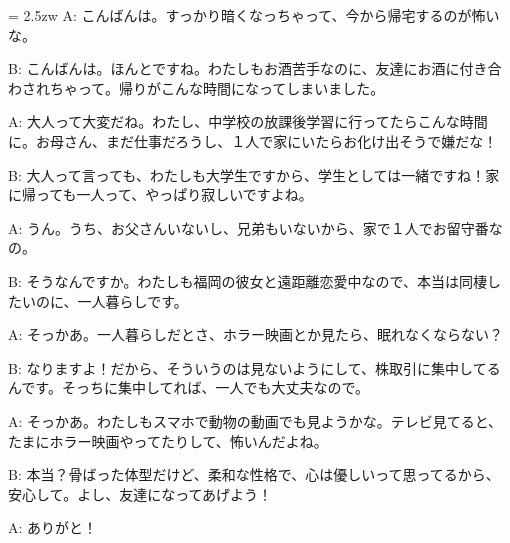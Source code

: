 \documentclass[11pt]{amsart}
\title{}
\author{}
\newenvironment{hangall}[1]{\hangindent = 2.5zw\everypar{\hangindent = 2.5zw}}{}
\begin{document}
\maketitle
\begin{hangall}{}%
A: こんばんは。すっかり暗くなっちゃって、今から帰宅するのが怖いな。



B: こんばんは。ほんとですね。わたしもお酒苦手なのに、友達にお酒に付き合わされちゃって。帰りがこんな時間になってしまいました。



A: 大人って大変だね。わたし、中学校の放課後学習に行ってたらこんな時間に。お母さん、まだ仕事だろうし、１人で家にいたらお化け出そうで嫌だな！



B: 大人って言っても、わたしも大学生ですから、学生としては一緒ですね！家に帰っても一人って、やっぱり寂しいですよね。



A: うん。うち、お父さんいないし、兄弟もいないから、家で１人でお留守番なの。



B: そうなんですか。わたしも福岡の彼女と遠距離恋愛中なので、本当は同棲したいのに、一人暮らしです。



A: そっかあ。一人暮らしだとさ、ホラー映画とか見たら、眠れなくならない？



B: なりますよ！だから、そういうのは見ないようにして、株取引に集中してるんです。そっちに集中してれば、一人でも大丈夫なので。



A: そっかあ。わたしもスマホで動物の動画でも見ようかな。テレビ見てると、たまにホラー映画やってたりして、怖いんだよね。



B: 本当？骨ばった体型だけど、柔和な性格で、心は優しいって思ってるから、安心して。よし、友達になってあげよう！



A: ありがと！\end{hangall}
\end{document}
